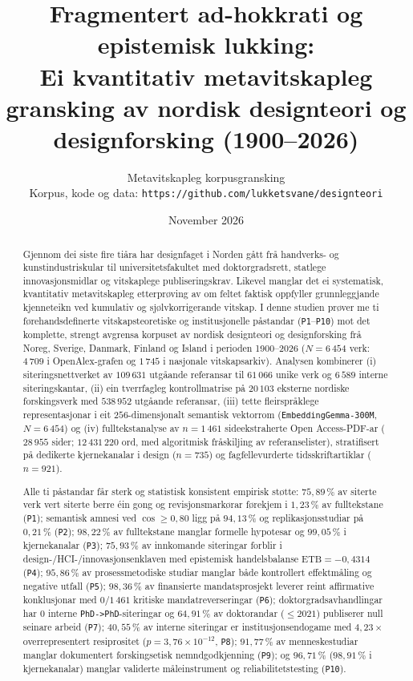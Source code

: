 \documentclass[11pt,a4paper]{article}
\title{\textbf{Fragmentert ad-hokkrati og epistemisk lukking:\\Ei kvantitativ metavitskapleg gransking av nordisk designteori og designforsking (1900--2026)}}
\author{Metavitskapleg korpusgransking \\ \small Korpus, kode og data: \texttt{https://github.com/lukketsvane/designteori}}
\date{November 2026}
\begin{document}
\maketitle

\begin{abstract}
\noindent Gjennom dei siste fire tiåra har designfaget i Norden gått frå handverks- og kunstindustriskular til universitetsfakultet med doktorgradsrett, statlege innovasjonsmidlar og vitskaplege publiseringskrav. Likevel manglar det ei systematisk, kvantitativ metavitskapleg etterprøving av om feltet faktisk oppfyller grunnleggjande kjenneteikn ved kumulativ og sjølvkorrigerande vitskap. I denne studien prøver me ti førehandsdefinerte vitskapsteoretiske og institusjonelle påstandar (\texttt{P1}--\texttt{P10}) mot det komplette, strengt avgrensa korpuset av nordisk designteori og designforsking frå Noreg, Sverige, Danmark, Finland og Island i perioden 1900--2026 ($N = 6\,454$ verk: $4\,709$ i OpenAlex-grafen og $1\,745$ i nasjonale vitskapsarkiv). Analysen kombinerer (i) siteringsnettverket av $109\,631$ utgåande referansar til $61\,066$ unike verk og $6\,589$ interne siteringskantar, (ii) ein tverrfagleg kontrollmatrise på $20\,103$ eksterne nordiske forskingsverk med $538\,952$ utgåande referansar, (iii) tette fleirspråklege representasjonar i eit $256$-dimensjonalt semantisk vektorrom (\texttt{EmbeddingGemma-300M}, $N = 6\,454$) og (iv) fulltekstanalyse av $n = 1\,461$ sideekstraherte Open Access-PDF-ar ($28\,955$ sider; $12\,431\,220$ ord, med algoritmisk fråskiljing av referanselister), stratifisert på dedikerte kjernekanalar i design ($n = 735$) og fagfellevurderte tidsskriftartiklar ($n = 921$).

Alle ti påstandar får sterk og statistisk konsistent empirisk støtte: $75{,}89\,\%$ av siterte verk vert siterte berre éin gong og revisjonsmarkørar førekjem i $1{,}23\,\%$ av fulltekstane (\texttt{P1}); semantisk amnesi ved $\cos \ge 0{,}80$ ligg på $94{,}13\,\%$ og replikasjonsstudiar på $0{,}21\,\%$ (\texttt{P2}); $98{,}22\,\%$ av fulltekstane manglar formelle hypotesar og $99{,}05\,\%$ i kjernekanalar (\texttt{P3}); $75{,}93\,\%$ av innkomande siteringar forblir i design-/HCI-/innovasjonsenklaven med epistemisk handelsbalanse $\mathrm{ETB} = -0{,}4314$ (\texttt{P4}); $95{,}86\,\%$ av prosessmetodiske studiar manglar både kontrollert effektmåling og negative utfall (\texttt{P5}); $98{,}36\,\%$ av finansierte mandatsprosjekt leverer reint affirmative konklusjonar med $0/1\,461$ kritiske mandatreverseringar (\texttt{P6}); doktorgradsavhandlingar har $0$ interne \texttt{PhD->PhD}-siteringar og $64{,}91\,\%$ av doktorandar ($\le 2021$) publiserer null seinare arbeid (\texttt{P7}); $40{,}55\,\%$ av interne siteringar er institusjonsendogame med $4{,}23\times$ overrepresentert resiprositet ($p = 3{,}76 \times 10^{-12}$, \texttt{P8}); $91{,}77\,\%$ av menneskestudiar manglar dokumentert forskingsetisk nemndgodkjenning (\texttt{P9}); og $96{,}71\,\%$ ($98{,}91\,\%$ i kjernekanalar) manglar validerte måleinstrument og reliabilitetstesting (\texttt{P10}).


\end{abstract}
\end{document}
